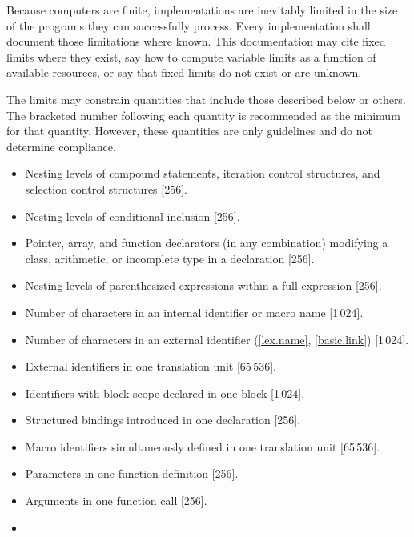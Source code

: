 
\pnum
Because computers are finite, \Cpp{}  implementations are inevitably
limited in the size of the programs they can successfully process.
Every implementation shall
document those limitations where known.
This documentation may cite fixed limits where they
exist, say how to compute variable limits as a function
of available resources, or say that fixed limits do not exist
or are unknown.

\pnum
The limits may constrain quantities
that include those described below or others.
The bracketed number following each quantity is recommended
as the minimum for that quantity.
However, these quantities are only guidelines and do not determine compliance.
\begin{itemize}
\item%
Nesting levels of compound statements,
iteration control structures,
and selection control structures [256].
\item%
Nesting levels of conditional inclusion [256].
\item%
Pointer, array, and function declarators
(in any combination)
modifying a class, arithmetic,
or incomplete type in a declaration [256].
\item%
Nesting levels of parenthesized expressions within a full-expression [256].
\item%
Number of
characters in an internal identifier
or macro name [1\,024].
\item%
Number of
characters in an external identifier (\ref{lex.name}, \ref{basic.link}) [1\,024].
\item%
External identifiers in one translation unit [65\,536].
\item%
Identifiers with block scope declared in one block [1\,024].
\item%
Structured bindings introduced in one declaration [256].
\item%
Macro identifiers simultaneously defined in one
translation
unit [65\,536].
\item%
Parameters in one function definition [256].
\item%
Arguments in one function call [256].
\item%

\end{itemize}
